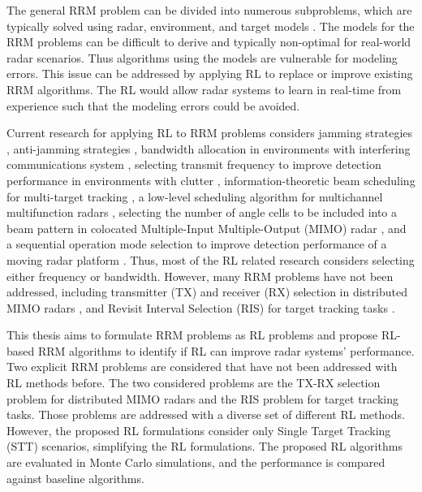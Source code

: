 \documentclass[english, 12pt, a4paper, elec, utf8, a-1b, online]{aaltothesis}
\numberwithin{equation}{section}
\begin{document}
The general RRM problem can be divided into numerous subproblems, which are typically solved using radar, environment, and target models \cite{Moo2016, Koch1999, Krishnamurthy2001, Wintenby2006, LaScala2006, Rajkumar1997, Rajkumar1998, Kastella1997, Kreucher2004, Kreucher2005, Xu2010}.
The models for the RRM problems can be difficult to derive and typically non-optimal for real-world radar scenarios. 
Thus algorithms using the models are vulnerable for modeling errors.
This issue can be addressed by applying RL to replace or improve existing RRM algorithms. 
The RL would allow radar systems to learn in real-time from experience such that the modeling errors could be avoided. 

Current research for applying RL to RRM problems considers
jamming strategies \cite{Qiang2017, Wang2019, Wang2019a, Zhang2019},
anti-jamming strategies \cite{Kang2018, Ak2019}, 
bandwidth allocation in environments with interfering communications system \cite{Selvi2018, Kozy2019},
selecting transmit frequency to improve detection performance in environments with clutter \cite{Wabeke2010}, 
information-theoretic beam scheduling for multi-target tracking \cite{Kreucher2005, Xu2010},
a low-level scheduling algorithm for multichannel multifunction radars \cite{Shaghaghi2018},
selecting the number of angle cells to be included into a beam pattern in colocated Multiple-Input Multiple-Output (MIMO) radar \cite{Wang2018}, 
and a sequential operation mode selection to improve detection performance of a moving radar platform \cite{Smits2008}.
Thus, most of the RL related research considers selecting either frequency or bandwidth. 
However, many RRM problems have not been addressed, including transmitter (TX) and receiver (RX) selection in distributed MIMO radars \cite{Godrich2011a, Godrich2011, Sun2014}, and Revisit Interval Selection (RIS) for target tracking tasks \cite{Cohen1986, Gardner1988, Munu1992, ChengTing2007,Baek2010, Keuk1975, Watson1993, vanKeuk1993, Daeipour1994, Shin1995, Benoudnine2006, MasoumiGanjgah2017, Charlish2015}.

This thesis aims to formulate RRM problems as RL problems and propose RL-based RRM algorithms to identify if RL can improve radar systems' performance.
Two explicit RRM problems are considered that have not been addressed with RL methods before.
The two considered problems are the TX-RX selection problem for distributed MIMO radars and the RIS problem for target tracking tasks.
Those problems are addressed with a diverse set of different RL methods.
However, the proposed RL formulations consider only Single Target Tracking (STT) scenarios, simplifying the RL formulations. 
The proposed RL algorithms are evaluated in Monte Carlo simulations, and the performance is compared against baseline algorithms.
\end{document}
